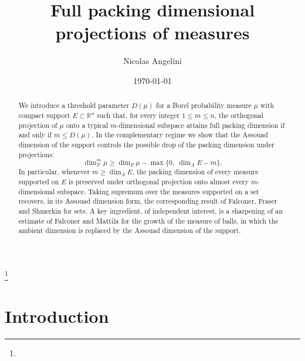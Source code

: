 \documentclass[12pt]{amsart}
\theoremstyle{definition}
\theoremstyle{remark}
\numberwithin{equation}{section}
\begin{document}
\title[Full-dimensional projections of measures]{Full packing dimensional projections of measures}


\author{Nicolas Angelini}

\curraddr{}
\address{Instituto de Matemática Aplicada San Luis (IMASL), CONICET, Argentina.  
Departamento de Matemática, FCFMyN, Universidad Nacional de San Luis, Argentina.}
\thanks{}





\date{\today}



\begin{abstract}
We introduce a threshold parameter $D(\mu)$
for a Borel probability measure $\mu$ with compact support
$E\subset\mathbb{R}^n$ such that, for
every integer $1\leq m\leq n$, the orthogonal projection of $\mu$ onto a
typical $m$-dimensional subspace attains full packing dimension if and
only if $m\leq D(\mu)$. In the complementary regime we show that the Assouad dimension of the
support controls the possible drop of the packing dimension under
projections:
$$\dim_P^{m}\mu\geq\dim_P\mu-\max\{0,\ \dim_A E-m\}.$$
In particular, whenever $m\geq\dim_A E$, the packing dimension of every
measure supported on $E$ is preserved under orthogonal projection onto
almost every $m$-dimensional subspace. Taking supremum over the measures
supported on a set recovers, in its Assouad dimension form, the
corresponding result of Falconer, Fraser and Shmerkin for sets. A key
ingredient, of independent interest, is a sharpening of an estimate of
Falconer and Mattila for the growth of the measure of balls, in which the
ambient dimension is replaced by the Assouad dimension of the support.
\end{abstract}


\maketitle

\section{Introduction}
\end{document}
